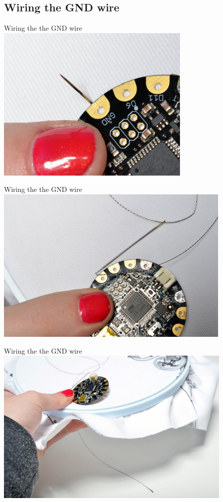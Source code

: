 \documentclass{beamer}
\begin{document}
\subsection{Wiring the GND wire}
\begin{frame}[fragile]{Wiring the the GND wire}
\includegraphics[height=3in]{flora_DSC_0099.jpg}
\end{frame}
\begin{frame}[fragile]{Wiring the the GND wire}
\includegraphics[height=3in]{flora_DSC_0100.jpg}
\end{frame}
\begin{frame}[fragile]{Wiring the the GND wire}
\includegraphics[height=3in]{flora_DSC_0101.jpg}
\end{frame}
\end{document}
